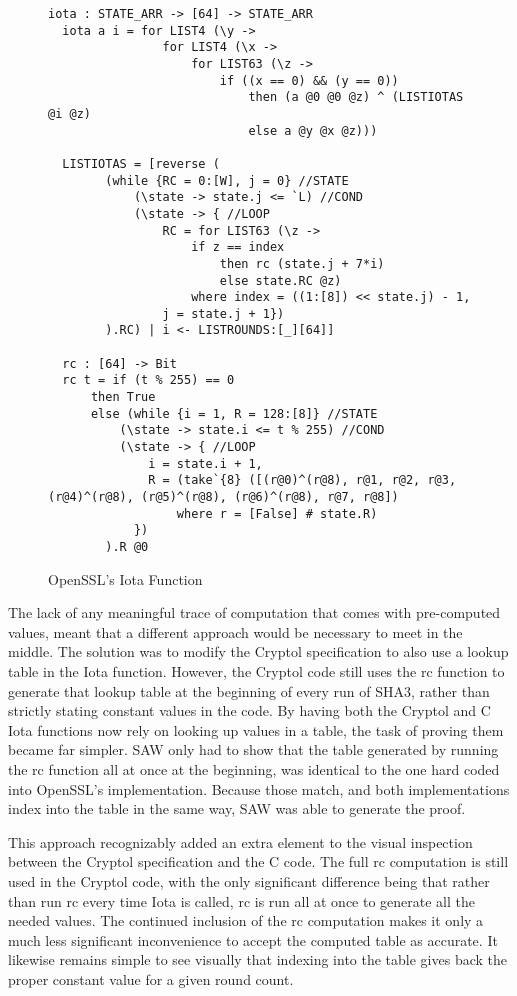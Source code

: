 \begin{figure}[h]
  \centering
\begin{lstlisting}[language=Cryptol]
  iota : STATE_ARR -> [64] -> STATE_ARR
  iota a i = for LIST4 (\y ->
                for LIST4 (\x ->
                    for LIST63 (\z ->
                        if ((x == 0) && (y == 0))
                            then (a @0 @0 @z) ^ (LISTIOTAS @i @z)
	                        else a @y @x @z)))

  LISTIOTAS = [reverse (
        (while {RC = 0:[W], j = 0} //STATE
            (\state -> state.j <= `L) //COND
            (\state -> { //LOOP
                RC = for LIST63 (\z ->
                    if z == index
                        then rc (state.j + 7*i)
                        else state.RC @z)
                    where index = ((1:[8]) << state.j) - 1,
                j = state.j + 1})
        ).RC) | i <- LISTROUNDS:[_][64]]

  rc : [64] -> Bit
  rc t = if (t % 255) == 0 
	  then True 
	  else (while {i = 1, R = 128:[8]} //STATE
		  (\state -> state.i <= t % 255) //COND
		  (\state -> { //LOOP
			  i = state.i + 1, 
			  R = (take`{8} ([(r@0)^(r@8), r@1, r@2, r@3, (r@4)^(r@8), (r@5)^(r@8), (r@6)^(r@8), r@7, r@8]) 
				  where r = [False] # state.R)
		    })
		).R @0
\end{lstlisting}
\caption{OpenSSL's Iota Function}
\label{fig:cryptolIota}
\end{figure}

The lack of any meaningful trace of computation that comes with pre-computed values, meant that a different approach would be necessary to meet in the middle.
The solution was to modify the Cryptol specification to also use a lookup table in the Iota function.
However, the Cryptol code still uses the rc function to generate that lookup table at the beginning of every run of SHA3, rather than strictly stating constant values in the code.
By having both the Cryptol and C Iota functions now rely on looking up values in a table, the task of proving them became far simpler.
SAW only had to show that the table generated by running the rc function all at once at the beginning, was identical to the one hard coded into OpenSSL's implementation.
Because those match, and both implementations index into the table in the same way, SAW was able to generate the proof.

This approach recognizably added an extra element to the visual inspection between the Cryptol specification and the C code.
The full rc computation is still used in the Cryptol code, with the only significant difference being that rather than run rc every time Iota is called, rc is run all at once to generate all the needed values.
The continued inclusion of the rc computation makes it only a much less significant inconvenience to accept the computed table as accurate. 
It likewise remains simple to see visually that indexing into the table gives back the proper constant value for a given round count.

